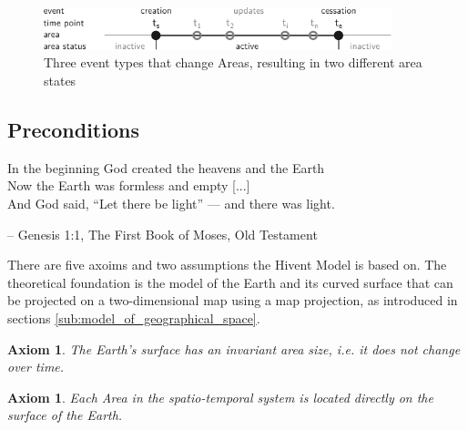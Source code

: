 \begin{figure}[H]
  \vspace{1em}
  \centering
  \includegraphics[width=0.9\textwidth]{graphics/development/area_states}
  \caption{Three event types that change Areas, resulting in two different area states}
  \label{fig:area_states}
\end{figure}




\subsection{Preconditions} %
\label{sub:preconditions}

\begin{quoteit}
In the beginning God created the heavens and the Earth \\
Now the Earth was formless and empty [...] \\
And God said, “Let there be light” --- and there was light.
\end{quoteit}
\vspace{-1em}
\hfill -- Genesis 1:1, The First Book of Moses, Old Testament

There are five axoims and two assumptions the Hivent Model is based on. The theoretical foundation is the model of the Earth and its curved surface that can be projected on a two-dimensional map using a map projection, as introduced in sections \ref{sub:model_of_geographical_space}.

\vspace{-1.0em}
\newtheorem{invariant_surface}[assicounter]{Axiom}
\begin{invariant_surface}
\label{axm:invariant_surface}
  The Earth's surface has an invariant area size, i.e. it does not change over time.
\end{invariant_surface}

\vspace{-2.5em}
\newtheorem{area_on_surface}[assicounter]{Axiom}
\begin{area_on_surface}
\label{axm:area_on_surface}
  Each Area in the spatio-temporal system is located directly on the surface of the Earth.
\end{area_on_surface}

